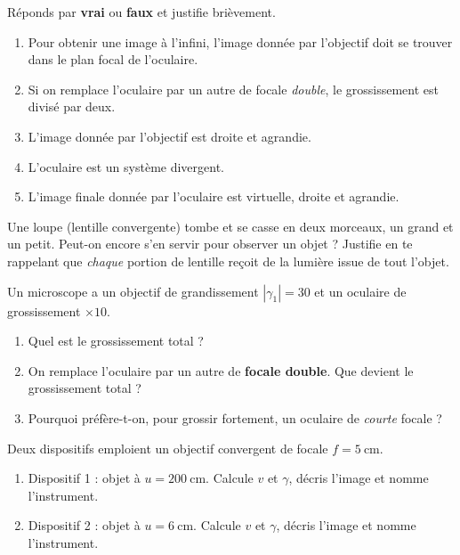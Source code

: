 \documentclass[11pt,a4paper]{article}
\begin{document}

\begin{exo}
Réponds par \textbf{vrai} ou \textbf{faux} et justifie brièvement.
\begin{enumerate}[label=\alph*)]
  \item Pour obtenir une image à l'infini, l'image donnée par l'objectif doit se trouver dans le plan
        focal de l'oculaire.
  \item Si on remplace l'oculaire par un autre de focale \emph{double}, le grossissement est divisé
        par deux.
  \item L'image donnée par l'objectif est droite et agrandie.
  \item L'oculaire est un système divergent.
  \item L'image finale donnée par l'oculaire est virtuelle, droite et agrandie.
\end{enumerate}
\end{exo}

\begin{exo}
Une loupe (lentille convergente) tombe et se casse en deux morceaux, un grand et un petit. Peut-on
encore s'en servir pour observer un objet ? Justifie en te rappelant que \emph{chaque} portion de
lentille reçoit de la lumière issue de tout l'objet.
\end{exo}

\begin{exo}
Un microscope a un objectif de grandissement $|\gamma_1|=30$ et un oculaire de grossissement $\times 10$.
\begin{enumerate}[label=\alph*)]
  \item Quel est le grossissement total ?
  \item On remplace l'oculaire par un autre de \textbf{focale double}. Que devient le grossissement
        total ?
  \item Pourquoi préfère-t-on, pour grossir fortement, un oculaire de \emph{courte} focale ?
\end{enumerate}
\end{exo}

\begin{exo}
Deux dispositifs emploient un objectif convergent de focale $f=\qty{5}{\cm}$.
\begin{enumerate}[label=\alph*)]
  \item Dispositif 1 : objet à $u=\qty{200}{\cm}$. Calcule $v$ et $\gamma$, décris l'image et nomme
        l'instrument.
  \item Dispositif 2 : objet à $u=\qty{6}{\cm}$. Calcule $v$ et $\gamma$, décris l'image et nomme
        l'instrument.
\end{enumerate}
\end{exo}
\end{document}
